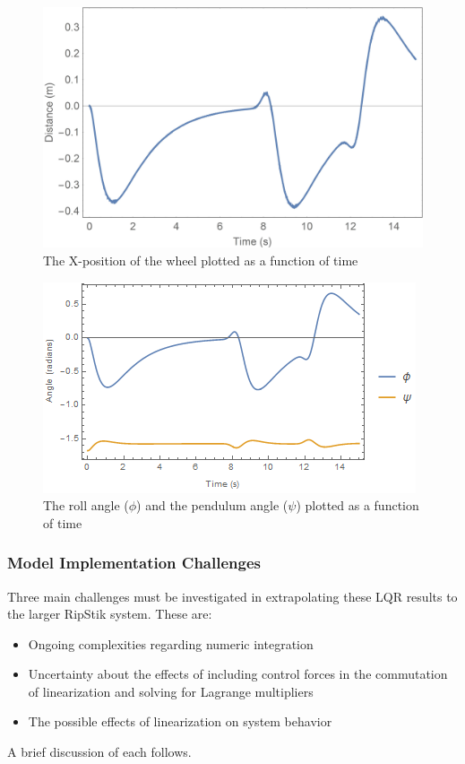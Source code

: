 \begin{figure}[!htb]
	\centering
	\includegraphics[width=\linewidth]{wheelperturbdistance.jpg}
	\endminipage\hspace{1em}%
	\caption{The X-position of the wheel plotted as a function of time}\label{fig:wheelperturbdistance}
\end{figure}

\begin{figure}[!htb]
	\centering
	\includegraphics[width=\linewidth]{wheelperturbphipsi.png}
	\endminipage\hspace{1em}%
	\caption{The roll angle ($\phi$) and the pendulum angle ($\psi$) plotted as a function of time}\label{fig:wheelperturbphipsi}
\end{figure}

\par
\subsubsection{Model Implementation Challenges}
Three main challenges must be investigated in extrapolating these LQR results to the larger RipStik system. These are:
\begin{itemize}
	\item Ongoing complexities regarding numeric integration
	\item Uncertainty about the effects of including control forces in the commutation of linearization and solving for Lagrange multipliers
	\item The possible effects of linearization on system behavior
\end{itemize}
A brief discussion of each follows.
